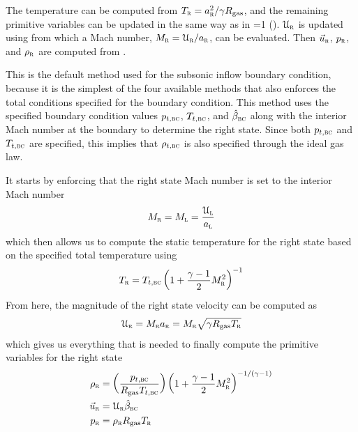 
The temperature can be computed from $T_{\textsc{r}} = a_{\textsc{r}}^2 / \gamma R_{\textrm{gas}}$,
and the remaining primitive variables can be updated in the same way as in
=1 ().
%
$\mathcal{U}_{\textsc{r}}$ is updated using 
from which a Mach number, $M_{\textsc{r}}=\mathcal{U}_{\textsc{r}} / a_{\textsc{r}}$, can be evaluated.
%
Then $\vec{u}_{\textsc{r}}$, $p_{\textsc{r}}$, and $\rho_{\textsc{r}}$ are computed from
.


\label{SEC:BC:Inflow:Subsonic:4}

This is the default method used for the subsonic inflow boundary condition,
because it is the simplest of the four available methods that also enforces the
total conditions specified for the boundary condition.
%
This method uses the specified boundary condition values $p_{t,\textsc{bc}}$,
$T_{t,\textsc{bc}}$, and $\hat{\beta}_{\textsc{bc}}$ along with the interior Mach number at the
boundary to determine the right state.
%
Since both $p_{t,\textsc{bc}}$ and $T_{t,\textsc{bc}}$ are specified, this implies that
$\rho_{t,\textsc{bc}}$ is also specified through the ideal gas law.


It starts by enforcing that the right state Mach number is set to the interior
Mach number
\[
  M_{\textsc{r}} = M_{\textsc{l}} = \frac{\mathcal{U}_{\textsc{l}}}{a_{\textsc{l}}}
\]
%
which then allows us to compute the static temperature for the
right state based on the specified total temperature using
%
\[
  T_{\textsc{r}} = T_{t,\textsc{bc}} \left(1 + \frac{\gamma-1}{2}M^2_{\textsc{r}}\right)^{-1}
\]
%
From here, the magnitude of the right state velocity can be computed as
%
\[
  \mathcal{U}_{\textsc{r}} = M_{\textsc{r}} a_{\textsc{r}} = M_{\textsc{r}} \sqrt{\gamma R_{\textrm{gas}} T_{\textsc{r}}}
\]
%
which gives us everything that is needed to finally compute the primitive
variables for the right state
%
\begin{alignat}{1}
     \rho_{\textsc{r}} & = \left( \frac{p_{t,\textsc{bc}}}{R_{\textrm{gas}} T_{t,\textsc{bc}}} \right)
                    \left( 1 + \frac{\gamma-1}{2} M^2_{\textsc{r}}
                    \right)^{-1 / \left( \gamma - 1 \right)} \\
  \vec{u}_{\textsc{r}} & = \mathcal{U}_{\textsc{r}} \hat{\beta}_{\textsc{bc}} \\
        p_{\textsc{r}} & = \rho_{\textsc{r}} R_{\textrm{gas}} T_{\textsc{r}}
  \label{EQ:BC:Inflow:Subsonic4:PV2}
\end{alignat}

